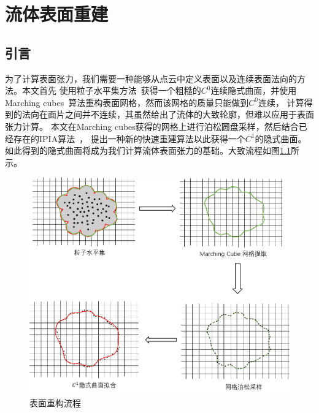 \chapter{流体表面重建} \label{chap3}
\section{引言}
为了计算表面张力，我们需要一种能够从点云中定义表面以及连续表面法向的方法。本文首先
使用粒子水平集方法~\cite{boyd2012multiflip}获得一个粗糙的$C^0$连续隐式曲面，并使用
Marching cubes~\cite{heiden1993fast}算法重构表面网格，然而该网格的质量只能做到$C^0$连续，
计算得到的法向在面片之间并不连续，其虽然给出了流体的大致轮廓，但难以应用于表面张力计算。
本文在Marching cubes获得的网格上进行泊松圆盘采样，然后结合已经存在的IPIA算法~\cite{hamza2020implicit}，
提出一种新的快速重建算法以此获得一个$C^1$的隐式曲面。如此得到的隐式曲面将成为我们计算流体表面张力的基础。大致流程如图\ref{fig:surface reconstruction pipeline}所示。

\begin{figure}[htbp]
    \centering
    \includegraphics[scale=0.8]{./images/surface_reconstruction.png}
    \caption{表面重构流程}
    \label{fig:surface reconstruction pipeline}
\end{figure}

